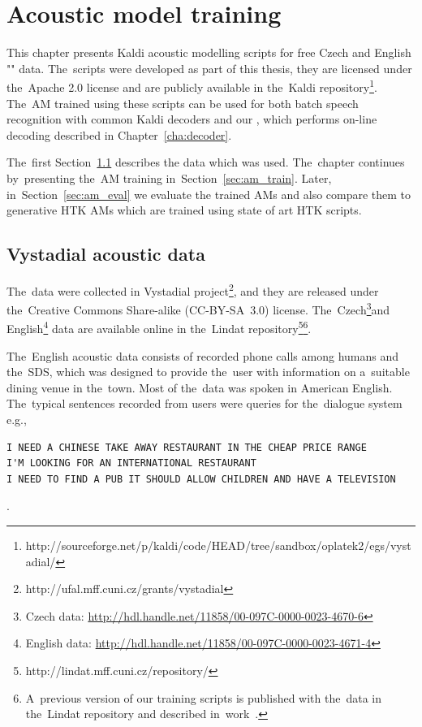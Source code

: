 \chapter{Acoustic model training}
\label{cha:train}

This chapter presents Kaldi acoustic modelling scripts for free Czech and English "" data.
The~scripts were developed as part of this thesis, they are licensed under the~Apache 2.0 license and are publicly available in the~Kaldi repository\footnote{http://sourceforge.net/p/kaldi/code/HEAD/tree/sandbox/oplatek2/egs/vystadial/}.
The~\acf{AM} trained using these scripts can be used for both batch speech recognition with common Kaldi decoders and our , which performs on-line decoding described in Chapter~\ref{cha:decoder}.

The~first Section~\ref{sec:data} describes the data which was used. 
The~chapter continues by~presenting the~\ac{AM} training in~Section~\ref{sec:am_train}. 
Later, in~Section~\ref{sec:am_eval} we evaluate the trained \acp{AM} and also compare them to generative \ac{HTK} \acp{AM} which are trained using state of art \ac{HTK} scripts.

\section{Vystadial acoustic data}
\label{sec:data}

The~data were collected in Vystadial project\footnote{http://ufal.mff.cuni.cz/grants/vystadial}, and they are released under the~Creative Commons Share-alike (CC-BY-SA~3.0) license. 
The~Czech\footnote{Czech data: \url{http://hdl.handle.net/11858/00-097C-0000-0023-4670-6}}and English\footnote{English data: \url{http://hdl.handle.net/11858/00-097C-0000-0023-4671-4}} data are available online in the~Lindat repository\footnote{{http://lindat.mff.cuni.cz/repository/}}\footnote{A~previous version of our training scripts is published with the~data in the~Lindat repository and described in~work~\cite{korvas_2014}.}.

The~English acoustic data consists of recorded phone calls among humans and the~\acl{SDS}, which was designed to provide the~user with information on a~suitable dining venue in the~town.
Most of the~data was spoken in American English.
The~typical sentences recorded from users were queries for the~dialogue system e.g.,
\begin{verbatim}
I NEED A CHINESE TAKE AWAY RESTAURANT IN THE CHEAP PRICE RANGE
I'M LOOKING FOR AN INTERNATIONAL RESTAURANT
I NEED TO FIND A PUB IT SHOULD ALLOW CHILDREN AND HAVE A TELEVISION
\end{verbatim}.

